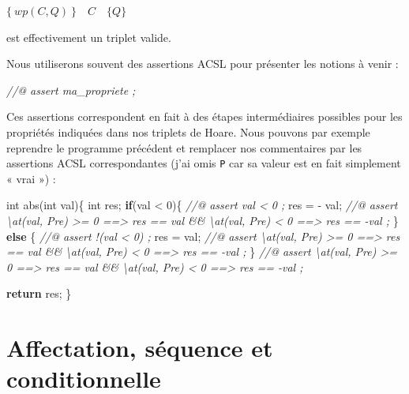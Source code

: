 \documentclass[12pt,francais,]{scrbook}
\newenvironment{Shaded}{}{}
\newcommand{\KeywordTok}[1]{\textcolor[rgb]{0.00,0.44,0.13}{\textbf{{#1}}}}
\newcommand{\DataTypeTok}[1]{\textcolor[rgb]{0.56,0.13,0.00}{{#1}}}
\newcommand{\DecValTok}[1]{\textcolor[rgb]{0.25,0.63,0.44}{{#1}}}
\newcommand{\CommentTok}[1]{\textcolor[rgb]{0.38,0.63,0.69}{\textit{{#1}}}}
\newcommand{\NormalTok}[1]{{#1}}
\begin{document}
\begin{center} \(\{\ wp(C,Q)\ \}\quad C\quad \{ Q \}\) \end{center}

est effectivement un triplet valide.

Nous utiliserons souvent des assertions ACSL pour présenter les notions
à venir :

\begin{footnotesize}\begin{Shaded}
\begin{Highlighting}[]
\CommentTok{//@ assert ma_propriete ;}
\end{Highlighting}
\end{Shaded}\end{footnotesize}

Ces assertions correspondent en fait à des étapes intermédiaires
possibles pour les propriétés indiquées dans nos triplets de Hoare. Nous
pouvons par exemple reprendre le programme précédent et remplacer nos
commentaires par les assertions ACSL correspondantes (j'ai omis
\texttt{P} car sa valeur est en fait simplement « vrai ») :

\begin{footnotesize}\begin{Shaded}
\begin{Highlighting}[]
\DataTypeTok{int} \NormalTok{abs(}\DataTypeTok{int} \NormalTok{val)\{}
  \DataTypeTok{int} \NormalTok{res;}
  \KeywordTok{if}\NormalTok{(val < }\DecValTok{0}\NormalTok{)\{}
    \CommentTok{//@ assert val < 0 ;}
    \NormalTok{res = - val;}
    \CommentTok{//@ assert \textbackslash{}at(val, Pre) >= 0 ==> res == val &&}
    \CommentTok{           \textbackslash{}at(val, Pre) < 0 ==> res == -val ;}
  \NormalTok{\} }\KeywordTok{else} \NormalTok{\{}
    \CommentTok{//@ assert !(val < 0) ;}
    \NormalTok{res = val;}
    \CommentTok{//@ assert \textbackslash{}at(val, Pre) >= 0 ==> res == val &&}
    \CommentTok{           \textbackslash{}at(val, Pre) < 0 ==> res == -val ;}
  \NormalTok{\}}
  \CommentTok{//@ assert \textbackslash{}at(val, Pre) >= 0 ==> res == val &&}
  \CommentTok{           \textbackslash{}at(val, Pre) < 0 ==> res == -val ;}

  \KeywordTok{return} \NormalTok{res;}
\NormalTok{\}}
\end{Highlighting}
\end{Shaded}\end{footnotesize}

\section{Affectation, séquence et
conditionnelle}\label{affectation-suxe9quence-et-conditionnelle}
\end{document}
